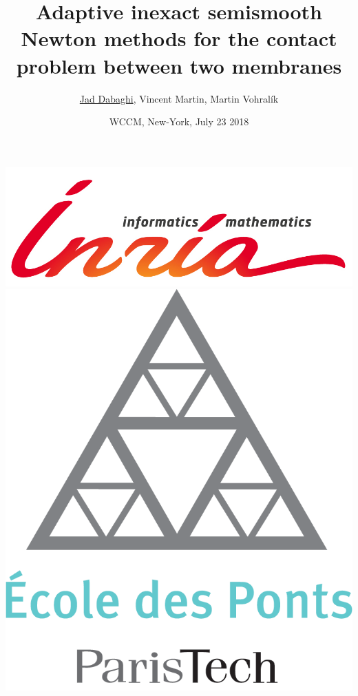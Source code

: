 \documentclass{beamer}
\title[WCCM 2018]{Adaptive inexact semismooth Newton methods for the contact problem between two membranes}
\author[Jad Dabaghi]{\underline{Jad Dabaghi}, Vincent Martin, Martin Vohral\'ik}
\institute[]{Inria Paris \& Université Paris-Est}
\date{WCCM, New-York, July 23 2018}
\begin{document}

\begin{frame}
\maketitle
\includegraphics[scale=0.3]{INRIA-SCIENTIFIQUE-UK-RVB}
\hfill \includegraphics[scale=0.08]{Logo_ponts_paristech}

\end{frame}
\end{document}
